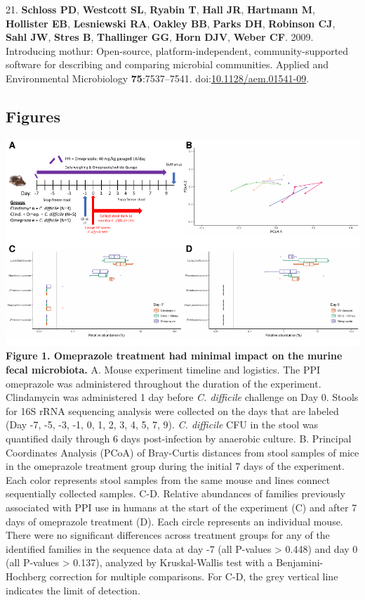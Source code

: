 \documentclass[11pt,]{article}
\begin{document}
\hypertarget{ref-Schloss2009}{}
21. \textbf{Schloss PD}, \textbf{Westcott SL}, \textbf{Ryabin T},
\textbf{Hall JR}, \textbf{Hartmann M}, \textbf{Hollister EB},
\textbf{Lesniewski RA}, \textbf{Oakley BB}, \textbf{Parks DH},
\textbf{Robinson CJ}, \textbf{Sahl JW}, \textbf{Stres B},
\textbf{Thallinger GG}, \textbf{Horn DJV}, \textbf{Weber CF}. 2009.
Introducing mothur: Open-source, platform-independent,
community-supported software for describing and comparing microbial
communities. Applied and Environmental Microbiology
\textbf{75}:7537--7541.
doi:\href{https://doi.org/10.1128/aem.01541-09}{10.1128/aem.01541-09}.

\newpage

\subsection{Figures}\label{figures}

\includegraphics{figure_1.pdf} \textbf{Figure 1. Omeprazole treatment
had minimal impact on the murine fecal microbiota.} A. Mouse experiment
timeline and logistics. The PPI omeprazole was administered throughout
the duration of the experiment. Clindamycin was administered 1 day
before \emph{C. difficile} challenge on Day 0. Stools for 16S rRNA
sequencing analysis were collected on the days that are labeled (Day -7,
-5, -3, -1, 0, 1, 2, 3, 4, 5, 7, 9). \emph{C. difficile} CFU in the
stool was quantified daily through 6 days post-infection by anaerobic
culture. B. Principal Coordinates Analysis (PCoA) of Bray-Curtis
distances from stool samples of mice in the omeprazole treatment group
during the initial 7 days of the experiment. Each color represents stool
samples from the same mouse and lines connect sequentially collected
samples. C-D. Relative abundances of families previously associated with
PPI use in humans at the start of the experiment (C) and after 7 days of
omeprazole treatment (D). Each circle represents an individual mouse.
There were no significant differences across treatment groups for any of
the identified families in the sequence data at day -7 (all P-values
\textgreater{} 0.448) and day 0 (all P-values \textgreater{} 0.137),
analyzed by Kruskal-Wallis test with a Benjamini-Hochberg correction for
multiple comparisons. For C-D, the grey vertical line indicates the
limit of detection.
\end{document}
